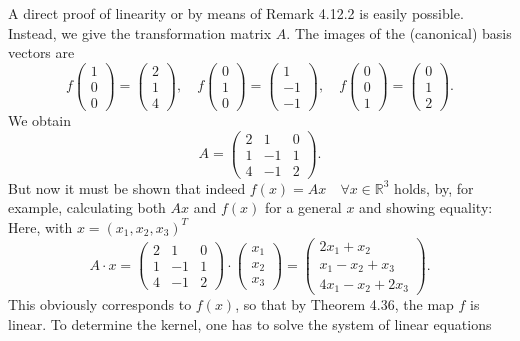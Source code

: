 A direct proof of linearity or by means of Remark 4.12.2 is easily possible. Instead, we give the transformation matrix $A$. The images of the (canonical) basis vectors are
\[
f\begin{pmatrix}
1 \\
0 \\
0
\end{pmatrix} =
\begin{pmatrix}
2 \\
1 \\
4
\end{pmatrix} , \quad
f\begin{pmatrix}
0 \\
1 \\
0
\end{pmatrix} =
\begin{pmatrix}
1 \\
-1 \\
-1
\end{pmatrix} , \quad
f\begin{pmatrix}
0 \\
0 \\
1
\end{pmatrix} =
\begin{pmatrix}
0 \\
1 \\
2
\end{pmatrix} .
\]
We obtain
\[
A =
\begin{pmatrix}
2 & 1 & 0 \\
1 & -1 & 1 \\
4 & -1 & 2
\end{pmatrix} .
\]
But now it must be shown that indeed $f(x) = Ax \quad \forall x \in \mathbb{R}^3$ holds, by, 
for example, calculating both $Ax$ and $f(x)$ for a 
general $x$ and showing equality: Here, with $x = (x_1, x_2, x_3)^T$
\[
A \cdot x =
\begin{pmatrix}
2 & 1 & 0 \\
1 & -1 & 1 \\
4 & -1 & 2
\end{pmatrix}
\cdot
\begin{pmatrix}
x_1 \\
x_2 \\
x_3
\end{pmatrix} =
\begin{pmatrix}
2x_1 + x_2 \\
x_1 - x_2 + x_3 \\
4x_1 - x_2 + 2x_3
\end{pmatrix} .
\]
This obviously corresponds to $f(x)$, so that by Theorem 4.36, the map $f$ is linear. To determine the kernel, one has to solve the system of linear equations
